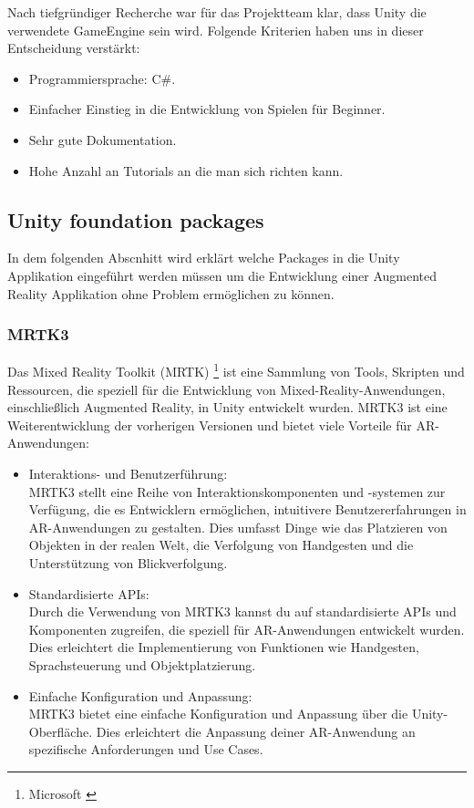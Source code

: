 Nach tiefgründiger Recherche war für das Projektteam klar, dass Unity die verwendete GameEngine sein wird.
Folgende Kriterien haben uns in dieser Entscheidung verstärkt:
\begin{itemize}
    \item Programmiersprache: C#.
    \item Einfacher Einstieg in die Entwicklung von Spielen für Beginner.
    \item Sehr gute Dokumentation.
    \item Hohe Anzahl an Tutorials an die man sich richten kann.
\end{itemize}


\subsection{Unity foundation packages}
In dem folgenden Abscnhitt wird erklärt welche Packages in die Unity Applikation
eingeführt werden müssen um die Entwicklung einer Augmented Reality Applikation ohne Problem
ermöglichen zu können.

\subsubsection{MRTK3}
Das Mixed Reality Toolkit (MRTK) \footnote{Microsoft \cite{MRTK3}} ist eine Sammlung von Tools,
Skripten und Ressourcen, die speziell für die Entwicklung von Mixed-Reality-Anwendungen, einschließlich Augmented
Reality, in Unity entwickelt wurden. MRTK3 ist eine Weiterentwicklung der vorherigen Versionen und bietet viele
Vorteile für AR-Anwendungen:
\begin{itemize}
    \item Interaktions- und Benutzerführung: \\
    MRTK3 stellt eine Reihe von Interaktionskomponenten und -systemen zur
    Verfügung, die es Entwicklern ermöglichen, intuitivere Benutzererfahrungen in AR-Anwendungen zu gestalten.
    Dies umfasst Dinge wie das Platzieren von Objekten in der realen Welt, die Verfolgung von Handgesten und die
    Unterstützung von Blickverfolgung.
    \item Standardisierte APIs: \\
    Durch die Verwendung von MRTK3 kannst du auf standardisierte APIs und Komponenten
    zugreifen, die speziell für AR-Anwendungen entwickelt wurden. Dies erleichtert die Implementierung von Funktionen
    wie Handgesten, Sprachsteuerung und Objektplatzierung.
    \item Einfache Konfiguration und Anpassung: \\
    MRTK3 bietet eine einfache Konfiguration und Anpassung über die
    Unity-Oberfläche. Dies erleichtert die Anpassung deiner AR-Anwendung an spezifische Anforderungen und Use Cases.
\end{itemize}

